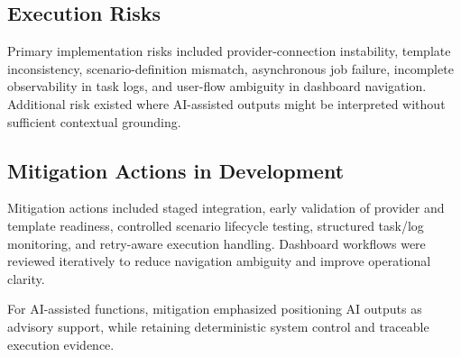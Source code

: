 \subsection{Execution Risks}
Primary implementation risks included provider-connection instability, template inconsistency, scenario-definition mismatch, asynchronous job failure, incomplete observability in task logs, and user-flow ambiguity in dashboard navigation. Additional risk existed where AI-assisted outputs might be interpreted without sufficient contextual grounding.

\subsection{Mitigation Actions in Development}
Mitigation actions included staged integration, early validation of provider and template readiness, controlled scenario lifecycle testing, structured task/log monitoring, and retry-aware execution handling. Dashboard workflows were reviewed iteratively to reduce navigation ambiguity and improve operational clarity.

For AI-assisted functions, mitigation emphasized positioning AI outputs as advisory support, while retaining deterministic system control and traceable execution evidence.

